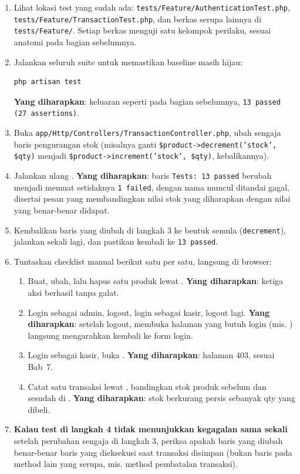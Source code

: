 \begin{enumerate}
  \item Lihat lokasi test yang sudah ada:
    \texttt{tests/Feature\allowbreak/AuthenticationTest\allowbreak.php},
    \texttt{tests/Feature\allowbreak/TransactionTest\allowbreak.php}, dan berkas
    serupa lainnya di \texttt{tests/Feature/}. Setiap berkas menguji satu
    kelompok perilaku, sesuai anatomi pada bagian sebelumnya.
  \item Jalankan seluruh suite untuk memastikan baseline masih hijau:
    \begin{lstlisting}[language=bash]
php artisan test
    \end{lstlisting}
    \textbf{Yang diharapkan}: keluaran seperti pada bagian sebelumnya,
    \texttt{13 passed (27 assertions)}.
  \item Buka \texttt{app/Http/Controllers/TransactionController.php},
    ubah sengaja baris pengurangan stok (misalnya ganti
    \texttt{\$product->decrement('stock', \$qty)} menjadi
    \texttt{\$product->increment('stock', \$qty)}, kebalikannya).
  \item Jalankan ulang . \textbf{Yang
    diharapkan}: baris \texttt{Tests: 13 passed} berubah menjadi
    memuat setidaknya \texttt{1 failed}, dengan nama
     muncul
    ditandai gagal, disertai pesan yang membandingkan nilai stok yang
    diharapkan dengan nilai yang benar-benar didapat.
  \item Kembalikan baris yang diubah di langkah 3 ke bentuk semula
    (\texttt{decrement}), jalankan  sekali
    lagi, dan pastikan kembali ke \texttt{13 passed}.
  \item Tuntaskan checklist manual berikut satu per satu, langsung di
    browser:
    \begin{enumerate}
      \item Buat, ubah, lalu hapus satu produk lewat .
        \textbf{Yang diharapkan}: ketiga aksi berhasil tanpa galat.
      \item Login sebagai admin, logout, login sebagai kasir, logout
        lagi. \textbf{Yang diharapkan}: setelah logout, membuka
        halaman yang butuh login (mis. ) langsung
        mengarahkan kembali ke form login.
      \item Login sebagai kasir, buka .
        \textbf{Yang diharapkan}: halaman 403, sesuai Bab~7.
      \item Catat satu transaksi lewat , bandingkan stok
        produk sebelum dan sesudah di .
        \textbf{Yang diharapkan}: stok berkurang persis sebanyak qty
        yang dibeli.
    \end{enumerate}
  \item \textbf{Kalau test di langkah 4 tidak menunjukkan kegagalan
    sama sekali} setelah perubahan sengaja di langkah 3, periksa apakah
    baris yang diubah benar-benar baris yang dieksekusi saat transaksi
    disimpan (bukan baris pada method lain yang serupa, mis. method
    pembatalan transaksi).
\end{enumerate}

